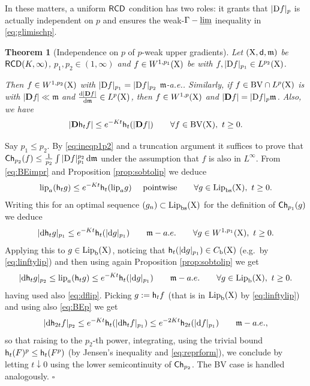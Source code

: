 \documentclass[11pt]{article}
\numberwithin{equation}{section}
\newtheorem{theorem}{Theorem}[section]
\newenvironment{idea}{\removelastskip\par\medskip   %
\noindent{\em Idea of the proof} \rm}{\penalty-20\null\hfill$\square$\par\medbreak}
\newcommand{\X}{{\rm X}}
\newcommand{\sfd}{{\sf d}}
\newcommand{\mm}{{\mathfrak m}}
\newcommand{\BV}{{\rm BV}}
\newcommand{\RCD}{{\sf RCD}}
\newcommand{\ch}{{\sf Ch}}
\renewcommand{\d}{{\rm d}}
\newcommand{\D}{{\rm D}}
\newcommand{\Lip}{{\rm Lip}}
\newcommand{\lipa}{{\rm lip}_a}
\newcommand{\limi}{\varliminf}
\newcommand{\bs}{{\rm bs}}
\renewcommand{\b}{{\rm b}}
\newcommand{\h}{{\sf h}} %
\newcommand{\DD}{\mathbf D}
\DeclareMathOperator*{\glimi}{{\Gamma-\limi}}
\begin{document}
In these matters, a uniform $\RCD$ condition has two roles: it grants that $|\D f|_p$ is actually independent on $p$ and ensures the weak-$\glimi$ inequality in \eqref{eq:glimischp}. 
\begin{theorem}[Independence on $p$ of  $p$-weak upper gradients]\label{thm:indp} Let $(\X,\sfd,\mm)$ be $\RCD(K,\infty)$, $p_1, p_2\in(1,\infty)$ and $f\in W^{1,p_1}(\X)$ be with $f,|\D f|_{p_1}\in L^{p_2}(\X)$. 

Then $f\in W^{1, p_2}(\X)$ with $|\D f|_{p_1}=|\D f|_{ p_2}$ $\mm$-a.e.. Similarly, if $f\in \BV\cap L^p(\X)$ is with $|\DD f|\ll\mm$ and $\frac{\d |\DD f|}{\d \mm}\in L^p(\X)$, then $f\in W^{1,p}(\X)$ and $|\DD f|=|\D f|_p\mm$. Also, we have
\begin{equation}
\label{eq:BEBV}
|\DD \h_tf|\leq e^{-Kt}\h_t(|\DD f|)\qquad\forall f\in \BV(\X),\ t\geq0. 
\end{equation}
\end{theorem}
\begin{idea} Say $p_1\leq  p_2$. By \eqref{eq:ineqp1p2} and a truncation argument it suffices to prove that $\ch_{ p_2}(f)\leq \tfrac1{p_2}\int|\D f|_{p_1}^{  p_2}\,\d\mm$ under the assumption that $f$ is also in $L^\infty$. From \eqref{eq:BEimpr} and Proposition \ref{prop:sobtolip} we deduce
\[
\lipa(\h_tg)\leq e^{-Kt}\h_t(\lipa g)\quad\text{ pointwise}\qquad\forall g\in \Lip_\bs(\X),\ t\geq0.
\]
Writing this for an optimal sequence $(g_n)\subset \Lip_\bs(\X)$ for the definition of $\ch_{p_1}(g)$  we deduce
\begin{equation}
\label{eq:BEp}
|\d\h_tg|_{p_1}\leq e^{-Kt}\h_t(|\d g|_{p_1})\qquad\mm-a.e.\qquad\forall g\in W^{1,{p_1}}(\X),\ t\geq0.
\end{equation}
Applying this to $g\in \Lip_\b(\X)$, noticing that $\h_t(|\d g|_{p_1})\in C_\b(\X)$ (e.g.\ by \eqref{eq:linftylip}) and then using again Proposition \ref{prop:sobtolip} we get
\[
|\d\h_t g|_{ p_2}\leq \lipa(\h_tg)\leq e^{-Kt}\h_t(|\d g|_{p_1})\qquad\mm-a.e.\qquad\forall g\in \Lip_\b(\X),\ t\geq0.
\]
having used also \eqref{eq:dflip}. Picking $g:=\h_tf$ (that is in $\Lip_\b(\X)$ by \eqref{eq:linftylip}) and using also \eqref{eq:BEp}   we get
\[
|\d\h_{2t}f |_{ p_2}\leq  e^{-Kt}\h_t(|\d \h_tf|_{p_1})\leq e^{-2Kt}\h_{2t}(|\d f|_{p_1})\qquad\mm-a.e.,
\]
so that raising to the $ p_2$-th power, integrating, using the trivial bound $\h_t(F)^p\leq \h_t(F^p)$ (by Jensen's inequality and \eqref{eq:reprform}), we conclude by letting $t\downarrow0$ using the lower semicontinuity of $\ch_{p_2}$. The BV case is handled analogously.
\end{idea}
\end{document}
